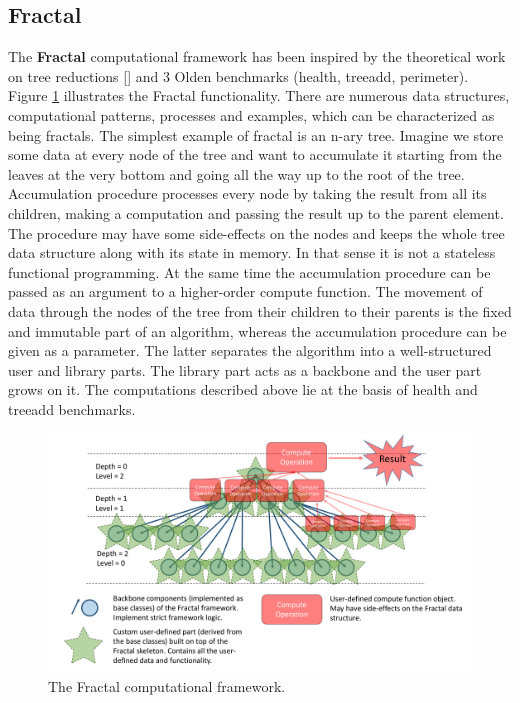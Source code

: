 \documentclass[10pt,a4paper]{report}
\begin{document}
\subsection{Fractal}
\quad The \textbf{Fractal} computational framework has been inspired by the theoretical work on tree reductions [] and 3 Olden benchmarks (health, treeadd, perimeter). Figure \ref{fig:fractal} illustrates the Fractal functionality.\newline\null
\quad There are numerous data structures, computational patterns, processes and examples, which can be characterized as being fractals.\newline\null
\quad The simplest example of fractal is an n-ary tree. Imagine we store some data at every node of the tree and want to accumulate it starting from the leaves at the very bottom and going all the way up to the root of the tree. Accumulation procedure processes every node by taking the result from all its children, making a computation and passing the result up to the parent element. The procedure may have some side-effects on the nodes and keeps the whole tree data structure along with its state in memory. In that sense it is not a stateless functional programming. At the same time the accumulation procedure can be passed as an argument to a higher-order compute function. The movement of data through the nodes of the tree from their children to their parents is the fixed and immutable part of an algorithm, whereas the accumulation procedure can be given as a parameter. The latter separates the algorithm into a well-structured user and library parts. The library part acts as a backbone and the user part grows on it. The computations described above lie at the basis of health and treeadd benchmarks.\newline\null
\begin{figure}[ht]
\includegraphics[width=1.0\textwidth]{images/Fractal.pdf}
\caption{The Fractal computational framework.}
\label{fig:fractal}
\end{figure}
\end{document}
